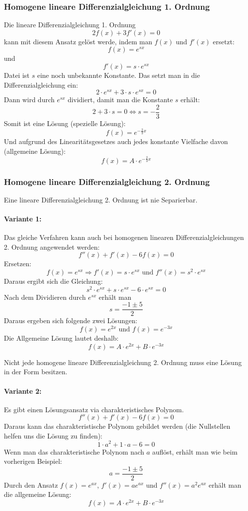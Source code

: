\subsubsection{Homogene lineare Differenzialgleichung 1. Ordnung}
Die lineare Differenzialgleichung 1. Ordnung
\[ 2f(x) + 3f'(x) = 0 \]
kann mit diesem Ansatz gelöst werde, indem man $f(x)$ und $f'(x)$
ersetzt:
\[ f(x) = e^{sx} \] und
\[ f'(x) = s \cdot e^{sx} \]
Datei ist $s$ eine noch unbekannte Konstante. Das setzt man in die
Differenzialgleichung ein:
\[ 2 \cdot e^{sx} + 3 \cdot s \cdot e^{sx} = 0 \]
Dann wird durch $e^{sx}$ dividiert, damit man die Konstante $s$ erhält:
\[ 2 + 3 \cdot s = 0 \Leftrightarrow s = - \frac{2}{3} \]
Somit ist eine Lösung (spezielle Lösung):
\[f(x) = e^{-\frac{2}{3}x} \]
Und aufgrund des Linearitätsgesetzes auch jedes konstante Vielfache
davon (allgemeine Lösung):
\[f(x) = A \cdot e^{-\frac{2}{3}x} \]

\subsubsection{Homogene lineare Differenzialgleichung 2. Ordnung}
Eine lineare Differenzialgleichung 2. Ordnung ist nie Separierbar.

\paragraph{Variante 1:} Das gleiche Verfahren kann auch bei homogenen
linearen Differenzialgleichungen 2. Ordnung angewendet werden:
\[ f''(x) + f'(x) - 6f(x) = 0 \]
Ersetzen:
\[ f(x) = e^{sx} \Rightarrow f'(x) = s \cdot e^{sx}
  \text{ und } f''(x) = s^2 \cdot e^{sx} \]
Daraus ergibt sich die Gleichung:
\[ s^2 \cdot e^{sx} + s \cdot e^{sx} - 6 \cdot e^{sx} = 0 \]
Nach dem Dividieren durch $e^{sx}$ erhält man
\[ s = \frac{-1 \pm 5}{2} \]
Daraus ergeben sich folgende zwei Lösungen:
\[ f(x) = e^{2x} \text{ und } f(x) = e^{-3x} \]
Die Allgemeine Lösung lautet deshalb:
\[ f(x) = A \cdot e^{2x} + B \cdot e^{-3x} \]

Nicht jede homogene lineare Differenzialgleichung 2. Ordnung muss eine
Lösung in der Form besitzen.

\paragraph{Variante 2:}
Es gibt einen Lösungsansatz via charakteristisches Polynom.
\[ f''(x) + f'(x) - 6f(x) = 0 \]
Daraus kann das charakteristische Polynom gebildet werden (die
Nullstellen helfen uns die Lösung zu finden):
\[ 1 \cdot a^2 + 1 \cdot a - 6 = 0 \]
Wenn man das charakteristische Polynom nach $a$ auflöst, erhält man wie beim vorherigen Beispiel:
\[ a = \frac{-1 \pm 5}{2} \]
Durch den Ansatz $f(x) = e^{ax}$, $f'(x) = ae^{ax}$ und $f''(x) =
a^{2}e^{ax}$ erhält man die allgemeine Lösung:
\[ f(x) = A \cdot e^{2x} + B \cdot e^{-3x} \]

